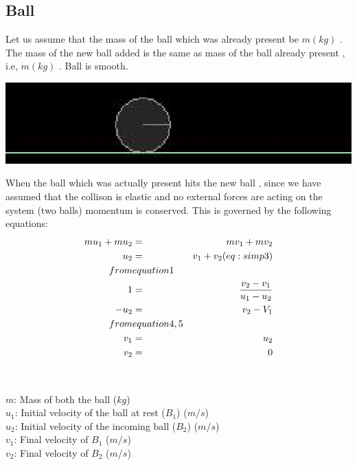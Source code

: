 \documentclass[11pt]{article}
\begin{document}
\subsection{Ball}
Let us assume that the mass of the ball which was already present be  $m (kg)$ . The mass of the new ball added is the same as  mass of the ball already present , i.e, $m (kg)$ . Ball is smooth.
\newline
\begin{center}
\includegraphics{Ball}
\end{center}
When the ball which was actually present hits the new ball , since we have assumed that the collison is elastic and no external forces are acting on the system (two balls)  momentum is conserved. This is governed by the following equations: \\

\begin {eqnarray}
  mu_1 + mu_2 & = & mv_1 + mv_2 \\
  u_2 & = & v_1 + v_2 \label: (eq:simp3)  \\
  from & equation 1 & \nonumber \\
  1 & = &  \frac{v_2-v_1}{u_1-u_2} \nonumber \\
  -u_2 & = & v_2 - V_1 \\
  from & equation 4 , 5 & \nonumber \\
  v_1 & = & u_2 \nonumber \\
  v_2 & = & 0  \nonumber 
\end{eqnarray}
\\
\\
$m$: Mass of both the ball ($kg$) \\
$u_1$: Initial velocity of the ball at rest ($B_1$) ($m/s$) \\ 
$u_2$: Initial velocity of the incoming ball ($B_2$) ($m/s$) \\
$v_1$: Final velocity of $B_1$ ($m/s$) \\  
$v_2$: Final velocity of $B_2$ ($m/s$) \\
\end{document}
